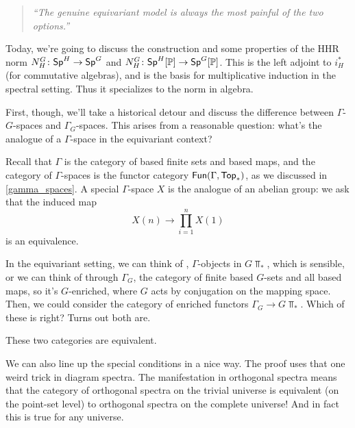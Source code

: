\begin{quote}\textit{
	``The genuine equivariant model is always the most painful of the two options.''
}\end{quote}
Today, we're going to discuss the construction and some properties of the HHR norm $N_H^G\colon \mathsf{Sp}^H\to\mathsf{Sp}^G$
and $N_H^G\colon \mathsf{Sp}^H[\mathbb P]\to\mathsf{Sp}^G[\mathbb P]$. This is the left adjoint to $i_H^*$ (for commutative algebras), and is
the basis for multiplicative induction in the spectral setting. Thus it specializes to the norm in algebra.

First, though, we'll take a historical detour and discuss the difference between $\Gamma$-$G$-spaces and
$\Gamma_G$-spaces. This arises from a reasonable question: what's the analogue of a $\Gamma$-space in the
equivariant context?

Recall that $\Gamma$ is the category of based finite sets and based maps, and the category of $\Gamma$-spaces is
the functor category $\mathsf{Fun}(\Gamma, \mathsf{Top}_*)$, as we discussed in \cref{gamma_spaces}. A special $\Gamma$-space $X$
is the analogue of an abelian group: we ask that the induced map
\[X(n)\longrightarrow\prod_{i=1}^n X(1)\]
is an equivalence.

In the equivariant setting, we can think of , $\Gamma$-objects in $G\Top_*$, which is
sensible, or we can think of  through $\Gamma_G$, the category of finite based $G$-sets and
all based maps, so it's $G$-enriched, where $G$ acts by conjugation on the mapping space. Then, we could consider
the category of enriched functors $\Gamma_G\to G\Top_*$. Which of these is right? Turns out both are.
\begin{prop}
These two categories are equivalent.
\end{prop}
We can also line up the special conditions in a nice way. The proof uses that one weird trick in diagram spectra.
The manifestation in orthogonal spectra means that the category of orthogonal spectra on the trivial universe is
equivalent (on the point-set level) to orthogonal spectra on the complete universe! And in fact this is true for
any universe.

